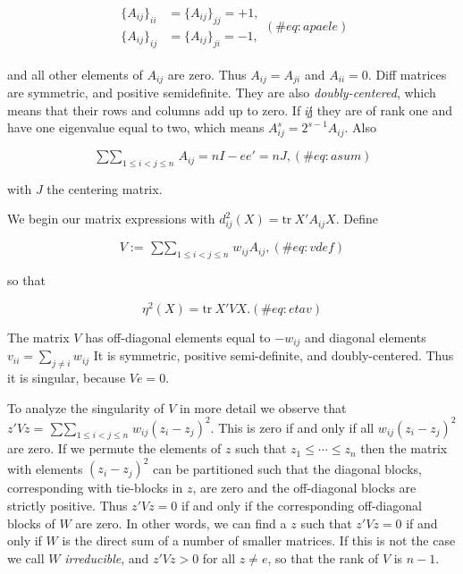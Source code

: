 \documentclass[
  12pt,
  letterpaper,
  DIV=11,
  numbers=noendperiod]{scrreprt}
\theoremstyle{remark}
\begin{document}
\begin{align}
\begin{split}
\{A_{ij}\}_{ii}&=\{A_{ij}\}_{jj}=+1,\\
\{A_{ij}\}_{ij}&=\{A_{ij}\}_{ji}=-1,
\end{split}
(\#eq:apaele)
\end{align}

and all other elements of \(A_{ij}\) are zero. Thus \(A_{ij}=A_{ji}\)
and \(A_{ii}=0\). Diff matrices are symmetric, and positive
semidefinite. They are also \emph{doubly-centered}, which means that
their rows and columns add up to zero. If \(i\not j\) they are of rank
one and have one eigenvalue equal to two, which means
\(A_{ij}^s=2^{s-1}A_{ij}\). Also

\begin{equation}
\mathop{\sum\sum}_{1\leq i<j\leq n} A_{ij}=nI-ee'=nJ,
(\#eq:asum)
\end{equation}

with \(J\) the centering matrix.

We begin our matrix expressions with
\(d_{ij}^2(X)=\text{tr}\ X'A_{ij}X\). Define

\begin{equation}
V:=\mathop{\sum\sum}_{1\leq i<j\leq n}w_{ij}A_{ij},
(\#eq:vdef)
\end{equation}

so that

\begin{equation}
\eta^2(X)=\text{tr}\ X'VX.
(\#eq:etav)
\end{equation}

The matrix \(V\) has off-diagonal elements equal to \(-w_{ij}\) and
diagonal elements \(v_{ii}=\sum_{j\not= i} w_{ij}\) It is symmetric,
positive semi-definite, and doubly-centered. Thus it is singular,
because \(Ve=0\).

To analyze the singularity of \(V\) in more detail we observe that
\(z'Vz=\mathop{\sum\sum}_{1\leq i<j\leq n}w_{ij}(z_i-z_j)^2\). This is
zero if and only if all \(w_{ij}(z_i-z_j)^2\) are zero. If we permute
the elements of \(z\) such that \(z_1\leq\cdots\leq z_n\) then the
matrix with elements \((z_i-z_j)^2\) can be partitioned such that the
diagonal blocks, corresponding with tie-blocks in \(z\), are zero and
the off-diagonal blocks are strictly positive. Thus \(z'Vz=0\) if and
only if the corresponding off-diagonal blocks of \(W\) are zero. In
other words, we can find a \(z\) such that \(z'Vz=0\) if and only if
\(W\) is the direct sum of a number of smaller matrices. If this is not
the case we call \(W\) \emph{irreducible}, and \(z'Vz>0\) for all
\(z\not= e\), so that the rank of \(V\) is \(n-1\).
\end{document}
